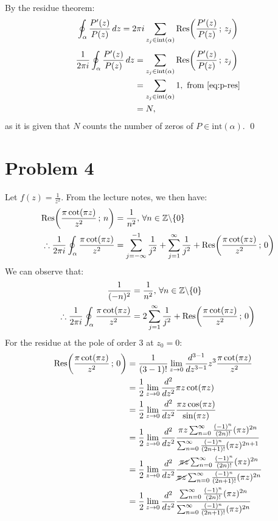 \documentclass[letterpaper, titlepage, DIV=14]{scrartcl}
\begin{document}
    By the residue theorem:
    \begin{equation*}
      \oint_{\alpha}\frac{P'(z)}{P(z)} \, dz = 2\pi i \sum_{z_{j}\in\text{int}(\alpha)} \Res(\frac{P'(z)}{P(z)} \, ; \, z_{j})
    \end{equation*}
    \begin{align*}
      \frac{1}{2\pi i}\oint_{\alpha}\frac{P'(z)}{P(z)} \, dz &= \sum_{z_{j}\in\text{int}(\alpha)} \Res(\frac{P'(z)}{P(z)} \, ; \, z_{j}) \\
      &= \sum_{z_{j}\in\text{int}(\alpha)} 1, \text{ from \eqref{eq:p-res}} \\
      &= N,
    \end{align*} as it is given that $N$ counts the number of zeros of $P\in\text{int}(\alpha)$. \qed
    
    
    \section*{Problem 4}
    Let $f(z)=\frac{1}{z^{2}}$. From the lecture notes, we then have:
    \begin{align*}
      \Res(\frac{\pi\cot(\pi z)}{z^{2}} \, ; \, n) &= \frac{1}{n^{2}}, \, \forall n \in \mathbb{Z}\backslash 
    \{0\} \\
    \therefore \frac{1}{2\pi i}\oint_{\alpha}\frac{\pi\cot(\pi z)}{z^{2}} &= \sum_{j=-\infty}^{-1} \frac{1}{j^{2}} + \sum_{j=1}^{\infty} \frac{1}{j^{2}} + \Res(\frac{\pi\cot(\pi z)}{z^{2}} \, ; \, 0)
    \end{align*}
    We can observe that:
    \begin{align}
      \frac{1}{(-n)^{2}} &= \frac{1}{n^{2}}, \, \forall n\in \mathbb{Z}\backslash\{0\} \nonumber \\ 
      \therefore \frac{1}{2\pi i}\oint_{\alpha}\frac{\pi\cot(\pi z)}{z^{2}} &= 2\sum_{j=1}^{\infty} \frac{1}{j^{2}} + \Res(\frac{\pi\cot(\pi z)}{z^{2}} \, ; \, 0) \label{eq:4-1}
    \end{align}
    For the residue at the pole of order 3 at $z_{0}=0$:
    \begin{align*}
      \Res(\frac{\pi\cot(\pi z)}{z^{2}} \, ; \, 0) &= \frac{1}{(3-1)!} \lim_{z\to0}\frac{d^{3-1}}{dz^{3-1}}z^{3}\frac{\pi\cot(\pi z)}{z^{2}} \\
      &= \frac{1}{2} \lim_{z\to0}\frac{d^{2}}{dz^{2}}\pi z\cot(\pi z) \\
      &= \frac{1}{2} \lim_{z\to0}\frac{d^{2}}{dz^{2}}\frac{\pi z \cos(\pi z)}{\sin(\pi z)} \\
      &= \frac{1}{2} \lim_{z\to0}\frac{d^{2}}{dz^{2}}\frac{\pi z\sum_{n=0}^{\infty}\frac{(-1)^{n}}{(2n)!}(\pi z)^{2n}}{\sum_{n=0}^{\infty}\frac{(-1)^{n}}{(2n+1)!}(\pi z)^{2n+1}} \\
      &= \frac{1}{2} \lim_{z\to0}\frac{d^{2}}{dz^{2}}\frac{\cancel{\pi z}\sum_{n=0}^{\infty}\frac{(-1)^{n}}{(2n)!}(\pi z)^{2n}}{\cancel{\pi z}\sum_{n=0}^{\infty}\frac{(-1)^{n}}{(2n+1)!}(\pi z)^{2n}} \\
      &= \frac{1}{2} \lim_{z\to0}\frac{d^{2}}{dz^{2}}\frac{\sum_{n=0}^{\infty}\frac{(-1)^{n}}{(2n)!}(\pi z)^{2n}}{\sum_{n=0}^{\infty}\frac{(-1)^{n}}{(2n+1)!}(\pi z)^{2n}} \\
    \end{align*}
\end{document}
